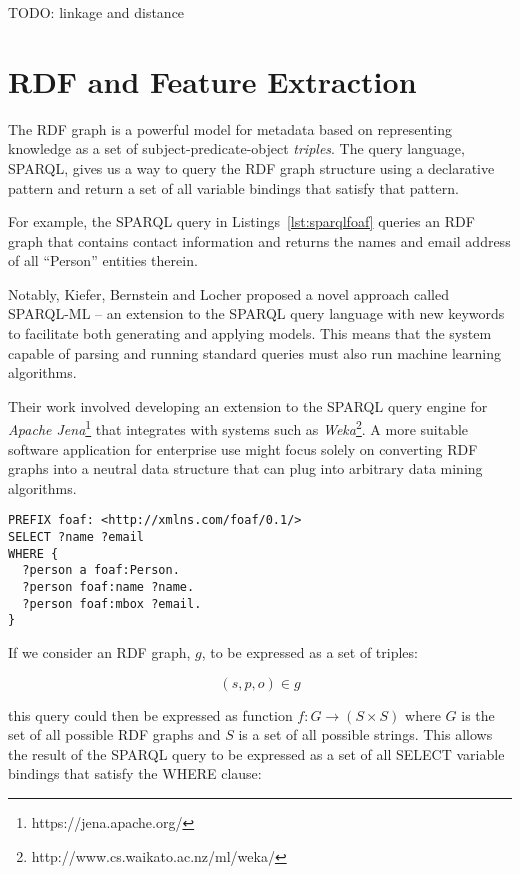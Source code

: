 TODO: linkage and distance

\section{RDF and Feature Extraction}
\label{sec:rdf-and-features}

The RDF graph is a powerful model
for metadata based on representing knowledge as a set of
subject-predicate-object \emph{triples}. The query language, SPARQL, gives us a
way to query the RDF graph structure using a declarative pattern and return a
set of all variable bindings that satisfy that pattern.

For example, the SPARQL query in Listings~\ref{lst:sparqlfoaf}
queries an RDF graph that contains contact information and returns the
names and email address of all ``Person'' entities therein.

Notably, Kiefer, Bernstein and Locher\cite{kiefer2008adding} proposed a novel
approach called SPARQL-ML -- an extension to the
SPARQL\cite{segaran2009programming} query language with new keywords to
facilitate both generating and applying models. This means that the system
capable of parsing and running standard queries must also run machine learning
algorithms.

Their work involved developing an extension to the SPARQL query
engine for \emph{Apache Jena}\footnote{https://jena.apache.org/} that integrates
with systems such as \emph{Weka}\footnote{http://www.cs.waikato.ac.nz/ml/weka/}.
A more suitable software application for enterprise use might focus solely on
converting RDF graphs into a neutral data structure that can plug into arbitrary
data mining algorithms.

\begin{lstlisting}[label=lst:sparqlfoaf,caption={Example SPARQL query for people's names and email addresses},language=sparql]
PREFIX foaf: <http://xmlns.com/foaf/0.1/>
SELECT ?name ?email
WHERE {
  ?person a foaf:Person.
  ?person foaf:name ?name.
  ?person foaf:mbox ?email.
}
\end{lstlisting}

If we consider an RDF graph, $g$, to be expressed as a set of triples:

\begin{displaymath}
  (s, p, o) \in g
\end{displaymath}

\noindent this query could then be
expressed as function $f: G \rightarrow (S \times S)$ where $G$ is the set of
all possible RDF graphs and $S$ is a set of all possible strings.
This allows the result of the
SPARQL query to be expressed as a set of all SELECT variable bindings that
satisfy the WHERE clause:


